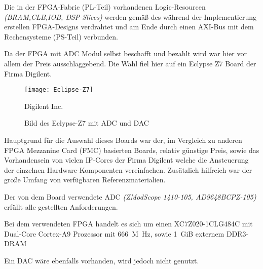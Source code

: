 Die in der \acs{FPGA}-Fabric (PL-Teil) vorhandenen Logic-Resourcen \textit{(\acs{BRAM},\acs{CLB},\acs{IOB}, \acs{DSP}-Slices)} werden gemäß des während der Implementierung erstellen
\acs{FPGA}-Designs verdrahtet und am Ende durch einen \acs{AXI}-Bus mit dem Rechensysteme (PS-Teil) verbunden. 

Da der \acs{FPGA} mit \acs{ADC} Modul selbst beschafft und bezahlt wird war hier vor allem der Preis ausschlaggebend.
Die Wahl fiel hier auf ein Eclypse Z7 Board der Firma Digilent.

\begin{figure}[h]
	\centering
	\texttt{[image: Eclipse-Z7]}
	\caption{Bild des Eclypse-Z7 mit ADC und DAC} \faCopyright Digilent Inc. \cite{DIG_EZ7_REF}
\end{figure}

Hauptgrund für die Auswahl dieses Boards war der, im Vergleich zu anderen FPGA Mezzanine Card (FMC) basierten Boards, relativ günstige Preis, sowie das Vorhandensein von
vielen IP-Cores der Firma Digilent welche die Ansteuerung der einzelnen Hardware-Komponenten vereinfachen. Zusätzlich hilfreich war der große Umfang von verfügbaren Referenzmaterialien.

Der von dem Board verwendete \acs{ADC} \textit{(ZModScope 1410-105, AD9648BCPZ-105)} erfüllt alle gestellten Anforderungen.\cite{DIG_EZ7_ADC_REF}

Bei dem verwendeten \acs{FPGA} handelt es sich um einen XC7Z020-1CLG484C mit Dual-Core Cortex-A9 Prozessor mit \qty{666}{M\hertz}, sowie \qty{1}{GiB} externem DDR3-DRAM\cite{DIG_EZ7_REF}

Ein DAC wäre ebenfalls vorhanden, wird jedoch nicht genutzt.

